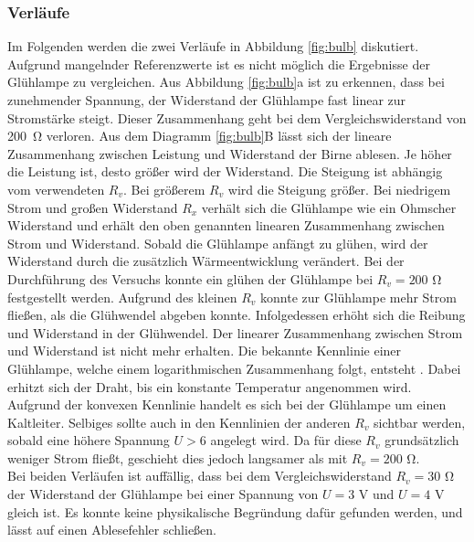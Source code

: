 \documentclass[a4paper,usenatbib]{aspdoc}
\begin{document}
            
            \subsubsection{Verläufe}
                Im Folgenden werden die zwei Verläufe in Abbildung \ref{fig:bulb} diskutiert. Aufgrund mangelnder Referenzwerte ist es nicht möglich die Ergebnisse der Glühlampe zu vergleichen. Aus Abbildung \ref{fig:bulb}a ist zu erkennen, dass bei zunehmender Spannung, der Widerstand der Glühlampe fast linear zur Stromstärke steigt. Dieser Zusammenhang geht bei dem Vergleichswiderstand von \SI{200}{\ohm} verloren.
                Aus dem Diagramm \ref{fig:bulb}B lässt sich der lineare Zusammenhang zwischen Leistung und Widerstand der Birne ablesen. Je höher die Leistung ist, desto größer wird der Widerstand. Die Steigung ist abhängig vom verwendeten $R_v$. Bei größerem $R_v$ wird die Steigung größer. Bei niedrigem Strom und großen Widerstand $R_x$ verhält sich die Glühlampe wie ein Ohmscher Widerstand und erhält den oben genannten linearen Zusammenhang zwischen Strom und Widerstand. Sobald die Glühlampe anfängt zu glühen, wird der Widerstand durch die zusätzlich Wärmeentwicklung verändert. Bei der Durchführung des Versuchs konnte ein glühen der Glühlampe bei $R_v = 200$ \si{\ohm} festgestellt werden. Aufgrund des kleinen $R_v$ konnte zur Glühlampe mehr Strom fließen, als die Glühwendel abgeben konnte. Infolgedessen erhöht sich die Reibung und Widerstand in der Glühwendel. Der linearer Zusammenhang zwischen Strom und Widerstand ist nicht mehr erhalten. Die bekannte Kennlinie einer Glühlampe, welche einem logarithmischen Zusammenhang folgt, entsteht \cite{tipler}. Dabei erhitzt sich der Draht, bis ein konstante Temperatur angenommen wird. Aufgrund der konvexen Kennlinie handelt es sich bei der Glühlampe um einen Kaltleiter. Selbiges sollte auch in den Kennlinien der anderen $R_v$ sichtbar werden, sobald eine höhere Spannung $U > 6$ angelegt wird. Da für diese $R_v$ grundsätzlich weniger Strom fließt, geschieht dies jedoch langsamer als mit $R_v = 200$ \si{\ohm}. \\
                Bei beiden Verläufen ist auffällig, dass bei dem Vergleichswiderstand $R_v = 30$ \si{\ohm} der Widerstand der Glühlampe bei einer Spannung von $U = 3$ \si{\volt} und $U = 4$ \si{\volt} gleich ist. Es konnte keine physikalische Begründung dafür gefunden werden, und lässt auf einen Ablesefehler schließen.
                
        
        
\end{document}
